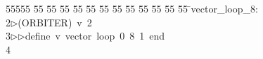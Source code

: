 %
%
\begin{tabbing}
55555 \= 55 \= 55 \= 55 \= 55 \= 55 \= 55 \= 55 \= 55 \= 55 \= 55 \= 55 \= 55 \= \>vector\_loop\_8:\\[0pt]
2\>$\triangleright$\>(ORBITER)\ v\ 2\ \\[0pt]
3\>$\triangleright$\>$\triangleright$\>define\ v\ vector\ loop\ 0\ 8\ 1\ end\ \\[0pt]
4\>\end{tabbing}
